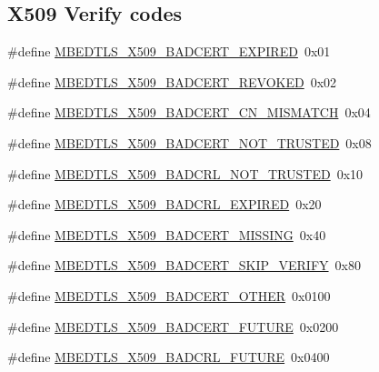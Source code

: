 \subsection*{X509 Verify codes}
\begin{DoxyCompactItemize}
\item 
\#define \hyperlink{group__x509__module_ga5f03158dcacc5914872e38c68231b642}{M\-B\-E\-D\-T\-L\-S\-\_\-\-X509\-\_\-\-B\-A\-D\-C\-E\-R\-T\-\_\-\-E\-X\-P\-I\-R\-E\-D}~0x01
\item 
\#define \hyperlink{group__x509__module_gaddd96a9eb80fab17bce02d2a147ea504}{M\-B\-E\-D\-T\-L\-S\-\_\-\-X509\-\_\-\-B\-A\-D\-C\-E\-R\-T\-\_\-\-R\-E\-V\-O\-K\-E\-D}~0x02
\item 
\#define \hyperlink{group__x509__module_ga6e71468985ebf243ca7cfce5c3dea881}{M\-B\-E\-D\-T\-L\-S\-\_\-\-X509\-\_\-\-B\-A\-D\-C\-E\-R\-T\-\_\-\-C\-N\-\_\-\-M\-I\-S\-M\-A\-T\-C\-H}~0x04
\item 
\#define \hyperlink{group__x509__module_ga0e5b1d4c9c1a1a3227238c82042c1d1b}{M\-B\-E\-D\-T\-L\-S\-\_\-\-X509\-\_\-\-B\-A\-D\-C\-E\-R\-T\-\_\-\-N\-O\-T\-\_\-\-T\-R\-U\-S\-T\-E\-D}~0x08
\item 
\#define \hyperlink{group__x509__module_gad1da8228ca957c2947fd329c32fc7ca4}{M\-B\-E\-D\-T\-L\-S\-\_\-\-X509\-\_\-\-B\-A\-D\-C\-R\-L\-\_\-\-N\-O\-T\-\_\-\-T\-R\-U\-S\-T\-E\-D}~0x10
\item 
\#define \hyperlink{group__x509__module_gaebccb1707af21f2d3d6610a7c6485f32}{M\-B\-E\-D\-T\-L\-S\-\_\-\-X509\-\_\-\-B\-A\-D\-C\-R\-L\-\_\-\-E\-X\-P\-I\-R\-E\-D}~0x20
\item 
\#define \hyperlink{group__x509__module_ga8bca03e3c2c89460bea17ab142b0b7ab}{M\-B\-E\-D\-T\-L\-S\-\_\-\-X509\-\_\-\-B\-A\-D\-C\-E\-R\-T\-\_\-\-M\-I\-S\-S\-I\-N\-G}~0x40
\item 
\#define \hyperlink{group__x509__module_ga1b87b2e1d26077023adf2a5c65a76776}{M\-B\-E\-D\-T\-L\-S\-\_\-\-X509\-\_\-\-B\-A\-D\-C\-E\-R\-T\-\_\-\-S\-K\-I\-P\-\_\-\-V\-E\-R\-I\-F\-Y}~0x80
\item 
\#define \hyperlink{group__x509__module_ga76bdd50937a671ef62474b7e38e23e02}{M\-B\-E\-D\-T\-L\-S\-\_\-\-X509\-\_\-\-B\-A\-D\-C\-E\-R\-T\-\_\-\-O\-T\-H\-E\-R}~0x0100
\item 
\#define \hyperlink{group__x509__module_gac769acbb18e53198ae2d2e63bd339cfa}{M\-B\-E\-D\-T\-L\-S\-\_\-\-X509\-\_\-\-B\-A\-D\-C\-E\-R\-T\-\_\-\-F\-U\-T\-U\-R\-E}~0x0200
\item 
\#define \hyperlink{group__x509__module_gad93c0f614969729f7d13fb0a3acac68e}{M\-B\-E\-D\-T\-L\-S\-\_\-\-X509\-\_\-\-B\-A\-D\-C\-R\-L\-\_\-\-F\-U\-T\-U\-R\-E}~0x0400

\end{DoxyCompactItemize}
